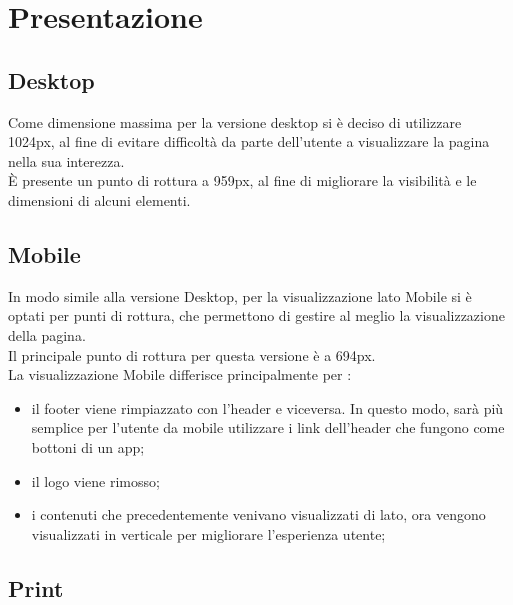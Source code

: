 \section{Presentazione}

  \subsection{Desktop}
    Come dimensione massima per la versione desktop si è deciso di utilizzare 1024px, al fine di evitare difficoltà da parte dell'utente a visualizzare la pagina nella sua interezza. \\
    È presente un punto di rottura a 959px, al fine di migliorare la visibilità e le dimensioni di alcuni elementi.

  \subsection{Mobile}
    In modo simile alla versione Desktop, per la visualizzazione lato Mobile si è optati per punti di rottura, che permettono di gestire al meglio la visualizzazione della pagina. \\
    Il principale punto di rottura per questa versione è a 694px. \\
    La visualizzazione Mobile differisce principalmente per :
    \begin{itemize}
      \item il footer viene rimpiazzato con l'header e viceversa. In questo modo, sarà più semplice per l'utente da mobile utilizzare i link dell'header che fungono come bottoni di un app;
      \item il logo viene rimosso;
      \item i contenuti che precedentemente venivano visualizzati di lato, ora vengono visualizzati in verticale per migliorare l'esperienza utente;
    \end{itemize}
  \subsection{Print}
    